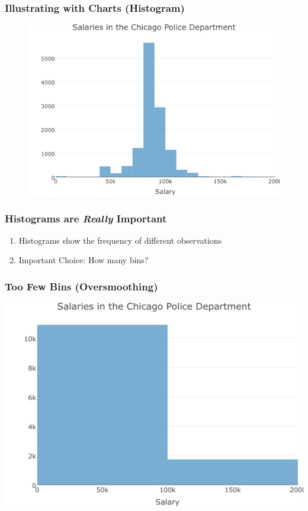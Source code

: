 \documentclass{beamer}
\begin{document}
\begin{frame}
\frametitle{Illustrating with Charts (Histogram)}
	\begin{figure}
		\includegraphics[scale = 0.5]{./images/chicagoHistogram.png}
	\end{figure}
\end{frame}

\begin{frame}
\frametitle{Histograms are \emph{Really} Important}
	\begin{enumerate}
		\item Histograms show the frequency of different observations
		\item \alert{Important Choice:} How many bins?
	\end{enumerate}
\end{frame}

\begin{frame}
\frametitle{Too Few Bins (Oversmoothing)}
	\includegraphics[width = \textwidth]{./images/histogramFew.png}
\end{frame}
\end{document}
